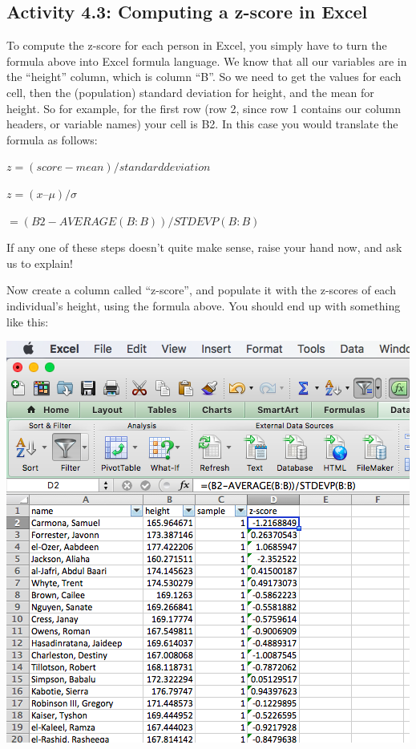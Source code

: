 \documentclass[
]{book}
\begin{document}
\hypertarget{activity-4.3-computing-a-z-score-in-excel}{%
\subsection{Activity 4.3: Computing a z-score in Excel}\label{activity-4.3-computing-a-z-score-in-excel}}

To compute the z-score for each person in Excel, you simply have to turn the formula above into Excel formula language. We know that all our variables are in the ``height'' column, which is column ``B''. So we need to get the values for each cell, then the (population) standard deviation for height, and the mean for height. So for example, for the first row (row 2, since row 1 contains our column headers, or variable names) your cell is B2. In this case you would translate the formula as follows:

\(z = (score - mean) / standard deviation\)

\(z = (x – μ) / σ\)

\(=(B2-AVERAGE(B:B))/STDEVP(B:B)\)

If any one of these steps doesn't quite make sense, raise your hand now, and ask us to explain!

Now create a column called ``z-score'', and populate it with the z-scores of each individual's height, using the formula above. You should end up with something like this:

\includegraphics{imgs/z-score-col.png}
\end{document}
